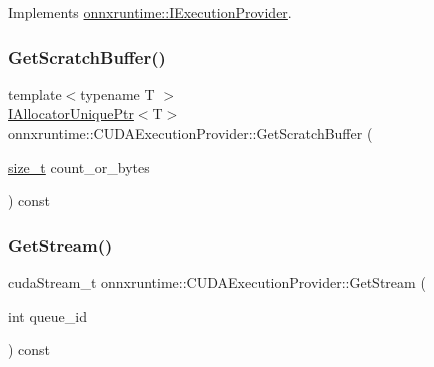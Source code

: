 Implements \mbox{\hyperlink{classonnxruntime_1_1IExecutionProvider_a83caf9a8da9fcbc4e7fdc891055d664d}{onnxruntime\+::\+I\+Execution\+Provider}}.

\mbox{\label{classonnxruntime_1_1CUDAExecutionProvider_a850dd443cf0b9e0d280fd342ef399696}} 
\subsubsection{\texorpdfstring{Get\+Scratch\+Buffer()}{GetScratchBuffer()}}
{\footnotesize\ttfamily template$<$typename T $>$ \\
\mbox{\hyperlink{namespaceonnxruntime_a323aace024f171700e4b07b299a178e7}{I\+Allocator\+Unique\+Ptr}}$<$T$>$ onnxruntime\+::\+C\+U\+D\+A\+Execution\+Provider\+::\+Get\+Scratch\+Buffer (\begin{DoxyParamCaption}\item[{\mbox{\hyperlink{mlasi_8h_a503efbc1c6e50825320ad909366b78ab}{size\+\_\+t}}}]{count\+\_\+or\+\_\+bytes }\end{DoxyParamCaption}) const\hspace{0.3cm}{\ttfamily [inline]}}

\mbox{\label{classonnxruntime_1_1CUDAExecutionProvider_ac97b455cec41500ac347f375ece13c1e}} 
\subsubsection{\texorpdfstring{Get\+Stream()}{GetStream()}}
{\footnotesize\ttfamily cuda\+Stream\+\_\+t onnxruntime\+::\+C\+U\+D\+A\+Execution\+Provider\+::\+Get\+Stream (\begin{DoxyParamCaption}\item[{int}]{queue\+\_\+id }\end{DoxyParamCaption}) const\hspace{0.3cm}{\ttfamily [inline]}}


